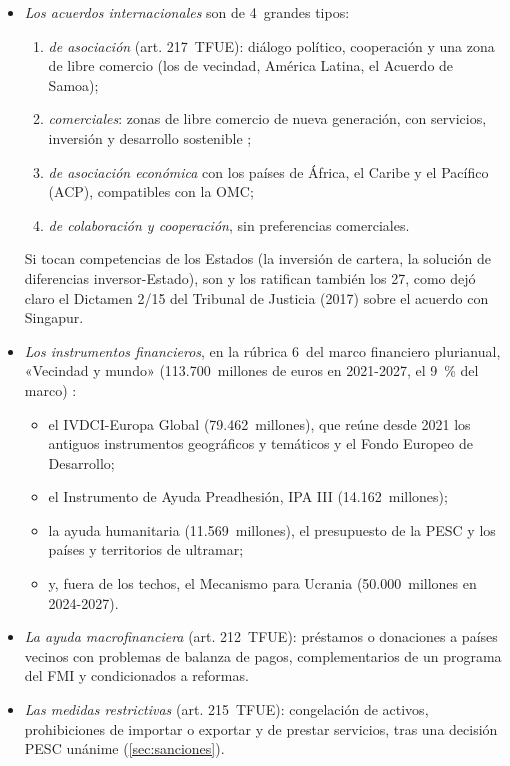 \documentclass[11pt]{article}
\begin{document}
\begin{itemize}
\item \emph{Los acuerdos internacionales} son de 4~grandes tipos:
  \begin{enumerate}
  \item \emph{de asociación} (art. 217~TFUE): diálogo político, cooperación y una zona de libre comercio (los de vecindad, América Latina, el Acuerdo de Samoa);
  \item \emph{comerciales}: zonas de libre comercio de nueva generación, con servicios, inversión y desarrollo sostenible ;
  \item \emph{de asociación económica} con los países de África, el Caribe y el Pacífico (ACP), compatibles con la OMC;
  \item \emph{de colaboración y cooperación}, sin preferencias comerciales.
  \end{enumerate}
  Si tocan competencias de los Estados (la inversión de cartera, la solución de diferencias inversor-Estado), son  y los ratifican también los 27, como dejó claro el Dictamen 2/15 del Tribunal de Justicia (2017) sobre el acuerdo con Singapur\nocite{TJUE2017Dictamen215}.
\item \emph{Los instrumentos financieros}, en la rúbrica 6~del marco financiero plurianual, «Vecindad y mundo» (113.700~millones de euros en 2021-2027, el 9~\% del marco)\nocite{CE2026Rubricas} :
  \begin{itemize}
  \item el IVDCI-Europa Global (79.462~millones), que reúne desde 2021 los antiguos instrumentos geográficos y temáticos y el Fondo Europeo de Desarrollo\nocite{UE2021IVDCI};
  \item el Instrumento de Ayuda Preadhesión, IPA III (14.162~millones)\nocite{UE2021IPA};
  \item la ayuda humanitaria (11.569~millones), el presupuesto de la PESC y los países y territorios de ultramar\nocite{CE2026Rubricas};
  \item y, fuera de los techos, el Mecanismo para Ucrania (50.000~millones en 2024-2027)\nocite{CE2026UcraniaDesembolso}.
  \end{itemize}
\item \emph{La ayuda macrofinanciera} (art. 212~TFUE): préstamos o donaciones a países vecinos con problemas de balanza de pagos, complementarios de un programa del FMI y condicionados a reformas.
\item \emph{Las medidas restrictivas} (art. 215~TFUE): congelación de activos, prohibiciones de importar o exportar y de prestar servicios, tras una decisión PESC unánime (\ref{sec:sanciones}).
\end{itemize}
\end{document}
